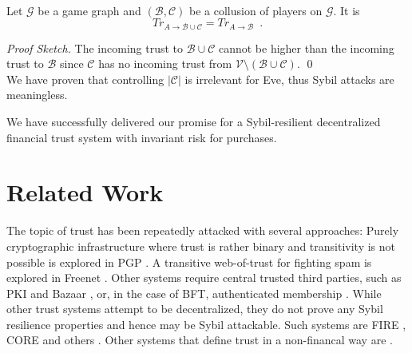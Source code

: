 \documentclass[11pt]{llncs}
\theoremstyle{definition}
\newenvironment{proofsketch}{\textit{Proof Sketch.}}{\qed \smallskip \ \\}
\begin{document}
    \begin{theorem} \ \\
       \label{sybil}
       Let $\mathcal{G}$ be a game graph and $\left(\mathcal{B}, \mathcal{C}\right)$ be a collusion of players on
       $\mathcal{G}$. It is
       \begin{equation*}
          Tr_{A \rightarrow \mathcal{B} \cup \mathcal{C}} = Tr_{A \rightarrow \mathcal{B}} \enspace.
       \end{equation*}
    \end{theorem}
    \begin{proofsketch}
       The incoming trust to $\mathcal{B} \cup \mathcal{C}$ cannot be higher than the incoming trust to $\mathcal{B}$ since
       $\mathcal{C}$ has no incoming trust from $\mathcal{V} \setminus \left(\mathcal{B} \cup \mathcal{C}\right)$.%
    \end{proofsketch}
    We have proven that controlling $|\mathcal{C}|$ is irrelevant for Eve, thus Sybil attacks are meaningless.

    We have successfully delivered our promise for a Sybil-resilient decentralized financial trust system with
    invariant risk for purchases.

  \section{Related Work}
     The topic of trust has been repeatedly attacked with several approaches: Purely cryptographic infrastructure where trust
     is rather binary and transitivity is not possible is explored in PGP \cite{pgp}. A transitive web-of-trust for fighting
     spam is explored in Freenet \cite{freenet}. Other systems require central trusted
     third parties, such as PKI \cite{pki} and Bazaar \cite{bazaar}, or, in the case of BFT, authenticated membership
     \cite{byzantine}. While other trust systems attempt to be decentralized, they do not prove any Sybil resilience
     properties and hence may be Sybil attackable. Such systems are FIRE \cite{fire}, CORE \cite{core} and others
     \cite{openrep,ghkkw,rk}. Other systems that define trust in a non-financal way are
     \cite{mui,beta,pace,vpc,sdt,wot,pathfinder}.
\end{document}
